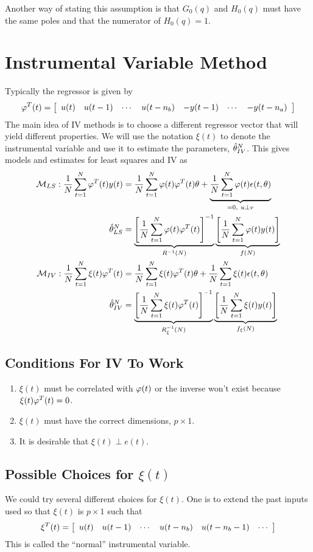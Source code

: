 Another way of stating this assumption is that $G_0(q)$ and $H_0(q)$ must have the same poles and that the numerator of $H_0(q)=1$.

\section{Instrumental Variable Method}
Typically the regressor is given by
$$\varphi^T(t) = \left[\begin{array}{c c c c c c c} u(t) & u(t-1) & \cdots & u(t-n_b) & -y(t-1) & \cdots & -y(t-n_a) \end{array}\right]$$
The main idea of IV methods is to choose a different regressor vector that will yield different properties. We will use the notation $\xi(t)$ to denote the instrumental variable and use it to estimate the parameters, $\hat{\theta}_{IV}^N$. This gives models and estimates for least squares and IV as
\begin{align*}
\mathcal{M}_{LS}: \frac{1}{N}\sum_{t=1}^N\varphi^T(t)y(t) &= \frac{1}{N}\sum_{t=1}^N\varphi(t)\varphi^T(t)\theta + \underbrace{\frac{1}{N}\sum_{t=1}^N\varphi(t)\epsilon(t,\theta)}_{=0,~u\perp v} \\
\hat{\theta}_{LS}^N &= \underbrace{\left[\frac{1}{N}\sum_{t=1}^N\varphi(t)\varphi^T(t)\right]^{-1}}_{R^{-1}(N)} \underbrace{\left[\frac{1}{N}\sum_{t=1}^N\varphi(t)y(t)\right]}_{f(N)} \\
\mathcal{M}_{IV}: \frac{1}{N}\sum_{t=1}^N\xi(t)\varphi^T(t) &= \frac{1}{N}\sum_{t=1}^N\xi(t)\varphi^T(t)\theta + \frac{1}{N}\sum_{t=1}^N\xi(t)\epsilon(t,\theta) \\
\hat{\theta}_{IV}^N &= \underbrace{\left[\frac{1}{N}\sum_{t=1}^N\xi(t)\varphi^T(t)\right]^{-1}}_{R_\xi^{-1}(N)} \underbrace{\left[\frac{1}{N}\sum_{t=1}^N\xi(t)y(t)\right]}_{f_\xi(N)}
\end{align*}

\subsection{Conditions For IV To Work}
\begin{enumerate}
\item $\xi(t)$ must be correlated with $\varphi(t)$ or the inverse won't exist because $\xi(t)\varphi^T(t) = 0$.
\item $\xi(t)$ must have the correct dimensions, $p\times 1$.
\item It is desirable that $\xi(t)\perp e(t)$.
\end{enumerate}

\subsection{Possible Choices for $\xi(t)$}
We could try several different choices for $\xi(t)$. One is to extend the past inputs used so that $\xi(t)$ is $p\times 1$ such that
$$\xi^T(t) = \left[\begin{array}{c c c c c c} u(t) & u(t-1) & \cdots & u(t-n_b) & u(t-n_b-1) & \cdots \end{array}\right]$$
This is called the ``normal'' instrumental variable.

